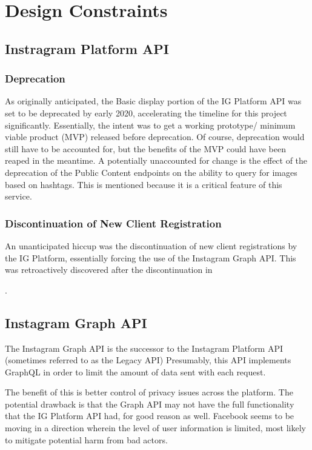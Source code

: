 \section{Design Constraints}

\subsection{Instragram Platform API}
\subsubsection{Deprecation}
As originally anticipated, the Basic display portion of the IG Platform API was set to be deprecated by early 2020,
accelerating the timeline for this project significantly. Essentially, the intent was to get a working prototype/
minimum viable product (MVP) released before deprecation. Of course, deprecation would still have to be accounted for,
but the benefits of the MVP could have been reaped in the meantime. A potentially unaccounted for change is the effect 
of the deprecation of the Public Content endpoints on the ability to query for images based on hashtags.
This is mentioned because it is a critical feature of this service.

\subsubsection{Discontinuation of New Client Registration}
An unanticipated hiccup was the discontinuation of new client registrations by the IG Platform,
essentially forcing the use of the Instagram Graph API. This was retroactively discovered after the discontinuation
in \date{October 15, 2019}.

\subsection{Instagram Graph API}
The Instagram Graph API is the successor to the Instagram Platform API (sometimes referred to as the Legacy API)
Presumably, this API implements GraphQL in order to limit the amount of data sent with each request.

The benefit of this is better control of privacy issues across the platform. The potential drawback is that
the Graph API may not have the full functionality that the IG Platform API had, for good reason as well.
Facebook seems to be moving in a direction wherein the level of user information is limited, most likely to mitigate potential harm from bad actors.


